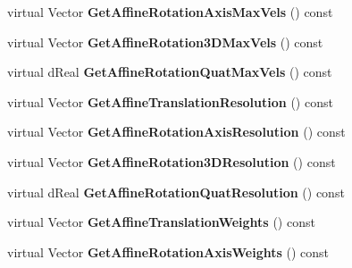 \begin{DoxyCompactItemize}
\item 
\hypertarget{classOpenRAVE_1_1RobotBase_abf108494f261bedf28da4c47dd1d1b67}{
virtual Vector {\bfseries GetAffineRotationAxisMaxVels} () const }
\label{classOpenRAVE_1_1RobotBase_abf108494f261bedf28da4c47dd1d1b67}

\item 
\hypertarget{classOpenRAVE_1_1RobotBase_a65da250f4afc4bc8bf1a806a7ec3770e}{
virtual Vector {\bfseries GetAffineRotation3DMaxVels} () const }
\label{classOpenRAVE_1_1RobotBase_a65da250f4afc4bc8bf1a806a7ec3770e}

\item 
\hypertarget{classOpenRAVE_1_1RobotBase_a0ee99bcf088bc54fa0c603bac5b382f6}{
virtual dReal {\bfseries GetAffineRotationQuatMaxVels} () const }
\label{classOpenRAVE_1_1RobotBase_a0ee99bcf088bc54fa0c603bac5b382f6}

\item 
\hypertarget{classOpenRAVE_1_1RobotBase_ae6354aaf3bdd8bc1e74b41406fa57bdc}{
virtual Vector {\bfseries GetAffineTranslationResolution} () const }
\label{classOpenRAVE_1_1RobotBase_ae6354aaf3bdd8bc1e74b41406fa57bdc}

\item 
\hypertarget{classOpenRAVE_1_1RobotBase_a66601f4bb3a81034eae0c679f82ed617}{
virtual Vector {\bfseries GetAffineRotationAxisResolution} () const }
\label{classOpenRAVE_1_1RobotBase_a66601f4bb3a81034eae0c679f82ed617}

\item 
\hypertarget{classOpenRAVE_1_1RobotBase_a6025846422a2a51036074376dc82c041}{
virtual Vector {\bfseries GetAffineRotation3DResolution} () const }
\label{classOpenRAVE_1_1RobotBase_a6025846422a2a51036074376dc82c041}

\item 
\hypertarget{classOpenRAVE_1_1RobotBase_ac2662710c28c1572b162274e2f11960c}{
virtual dReal {\bfseries GetAffineRotationQuatResolution} () const }
\label{classOpenRAVE_1_1RobotBase_ac2662710c28c1572b162274e2f11960c}

\item 
\hypertarget{classOpenRAVE_1_1RobotBase_a5f4ceb6a03fd622bc1a6c91129ab3d18}{
virtual Vector {\bfseries GetAffineTranslationWeights} () const }
\label{classOpenRAVE_1_1RobotBase_a5f4ceb6a03fd622bc1a6c91129ab3d18}

\item 
\hypertarget{classOpenRAVE_1_1RobotBase_af9be1867b964acf453eb90ff928984b7}{
virtual Vector {\bfseries GetAffineRotationAxisWeights} () const }
\label{classOpenRAVE_1_1RobotBase_af9be1867b964acf453eb90ff928984b7}


\end{DoxyCompactItemize}
